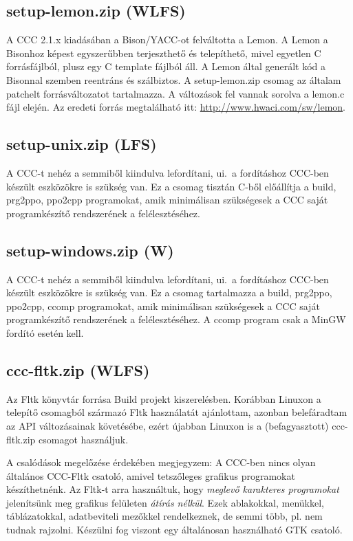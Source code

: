\subsection{setup-lemon.zip (WLFS)}

A CCC 2.1.x kiadásában a Bison/YACC-ot felváltotta a Lemon. 
A Lemon a Bisonhoz képest egyszerűbben terjeszthető és telepíthető,
mivel egyetlen C forrásfájlból, plusz egy C template fájlból áll.
A Lemon által generált kód a Bisonnal szemben reentráns és szálbiztos. 
A setup-lemon.zip csomag az általam patchelt forrásváltozatot tartalmazza. 
A változások fel vannak sorolva a lemon.c fájl elején. Az eredeti
forrás megtalálható itt: 
\href{http://www.hwaci.com/sw/lemon}{http://www.hwaci.com/sw/lemon}.

\subsection{setup-unix.zip (LFS)}
A CCC-t nehéz a semmiből kiindulva lefordítani, ui.\ a fordításhoz
CCC-ben készült eszközökre is szükség van. Ez a csomag tisztán C-ből
előállítja a build, prg2ppo, ppo2cpp programokat, amik minimálisan
szükségesek a CCC saját programkészítő rendszerének a felélesztéséhez.

\subsection{setup-windows.zip (W)}
A CCC-t nehéz a semmiből kiindulva lefordítani, ui.\ a fordításhoz
CCC-ben készült eszközökre is szükség van. Ez a csomag tartalmazza
a build, prg2ppo, ppo2cpp, ccomp programokat, amik minimálisan
szükségesek a CCC saját programkészítő rendszerének a felélesztéséhez.
A ccomp program csak a MinGW fordító esetén kell.

\subsection{ccc-fltk.zip (WLFS)}
Az Fltk könyvtár forrása Build projekt kiszerelésben.
Korábban Linuxon a telepítő csomagból származó Fltk használatát
ajánlottam, azonban belefáradtam az API változásainak követésébe,
ezért újabban Linuxon is a (befagyasztott) ccc-fltk.zip csomagot 
használjuk.

A csalódások megelőzése érdekében megjegyzem:
A CCC-ben nincs olyan általános CCC-Fltk csatoló, 
amivel tetszőleges grafikus programokat készíthetnénk.
Az Fltk-t arra használtuk, hogy {\em meglevő karakteres
programokat\/} jelenítsünk meg grafikus felületen {\em átírás nélkül}.
Ezek ablakokkal, menükkel, táblázatokkal, 
adatbeviteli mezőkkel rendelkeznek, de semmi több, 
pl. nem tudnak rajzolni. Készülni fog viszont egy
általánosan használható GTK csatoló.

